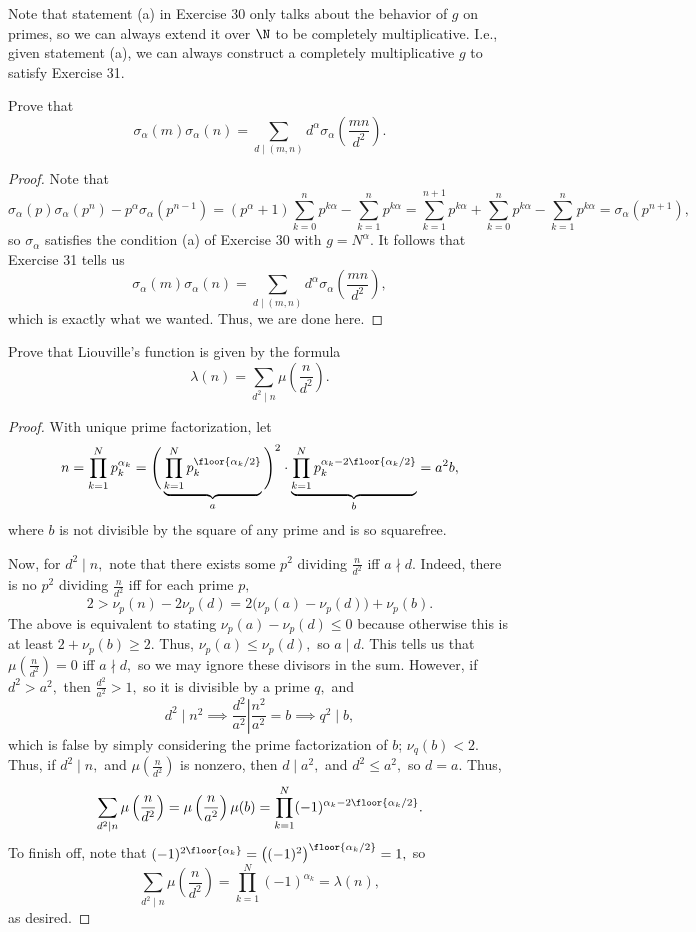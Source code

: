 Note that statement (a) in Exercise 30 only talks about the behavior of $g$ on primes, so we can always extend it over $\N$ to be completely multiplicative. I.e., given statement (a), we can always construct a completely multiplicative $g$ to satisfy Exercise 31.

\begin{exercise}
Prove that
\[\sigma_\alpha(m)\sigma_\alpha(n)=\sum_{d\mid(m,n)}d^\alpha\sigma_\alpha\left(\frac{mn}{d^2}\right).\]
\end{exercise}

\begin{proof}
Note that
\[\sigma_\alpha(p)\sigma_\alpha\left(p^n\right)-p^\alpha\sigma_\alpha\left(p^{n-1}\right)=\left(p^\alpha+1\right)\sum_{k=0}^np^{k\alpha}-\sum_{k=1}^{n}p^{k\alpha}=\sum_{k=1}^{n+1}p^{k\alpha}+\sum_{k=0}^np^{k\alpha}-\sum_{k=1}^np^{k\alpha}=\sigma_\alpha\left(p^{n+1}\right),\]
so $\sigma_\alpha$ satisfies the condition (a) of Exercise 30 with $g=N^\alpha.$ It follows that Exercise 31 tells us
\[\sigma_\alpha(m)\sigma_\alpha(n)=\sum_{d\mid(m,n)}d^\alpha\sigma_\alpha\left(\frac{mn}{d^2}\right),\]
which is exactly what we wanted. Thus, we are done here.
\end{proof}

\begin{exercise}
Prove that Liouville's function is given by the formula
\[\lambda(n)=\sum_{d^2\mid n}\mu\left(\frac n{d^2}\right).\]
\end{exercise}

\begin{proof}
With unique prime factorization, let
\[n=\prod_{k=1}^Np_k^{\alpha_k}=\Bigg(\underbrace{\prod_{k=1}^Np_k^{\floor{\alpha_k/2}}}_a\Bigg)^2\cdot\underbrace{\prod_{k=1}^Np_k^{\alpha_k-2\floor{\alpha_k/2}}}_b=a^2b,\]
where $b$ is not divisible by the square of any prime and is so squarefree.

Now, for $d^2\mid n,$ note that there exists some $p^2$ dividing $\frac n{d^2}$ iff $a\nmid d.$ Indeed, there is no $p^2$ dividing $\frac n{d^2}$ iff for each prime $p,$
\[2>\nu_p(n)-2\nu_p(d)=2\big(\nu_p(a)-\nu_p(d)\big)+\nu_p(b).\]
The above is equivalent to stating $\nu_p(a)-\nu_p(d)\le0$ because otherwise this is at least $2+\nu_p(b)\ge2.$ Thus, $\nu_p(a)\le\nu_p(d),$ so $a\mid d.$ This tells us that $\mu\left(\frac n{d^2}\right)=0$ iff $a\nmid d,$ so we may ignore these divisors in the sum. However, if $d^2>a^2,$ then $\frac{d^2}{a^2}>1,$ so it is divisible by a prime $q,$ and
\[d^2\mid n^2\implies\frac{d^2}{a^2}\left|\frac{n^2}{a^2}=b\right.\implies q^2\mid b,\]
which is false by simply considering the prime factorization of $b$; $\nu_q(b)<2.$ Thus, if $d^2\mid n,$ and $\mu\left(\frac n{d^2}\right)$ is nonzero, then $d\mid a^2,$ and $d^2\le a^2,$ so $d=a.$ Thus,
\[\sum_{d^2\mid n}\mu\left(\frac n{d^2}\right)=\mu\left(\frac n{a^2}\right)\mu(b)=\prod_{k=1}^N(-1)^{\alpha_k-2\floor{\alpha_k/2}}.\]
To finish off, note that $(-1)^{2\floor{\alpha_k}}=\left((-1)^2\right)^{\floor{\alpha_k/2}}=1,$ so
\[\sum_{d^2\mid n}\mu\left(\frac n{d^2}\right)=\prod_{k=1}^N(-1)^{\alpha_k}=\lambda(n),\]
as desired.
\end{proof}